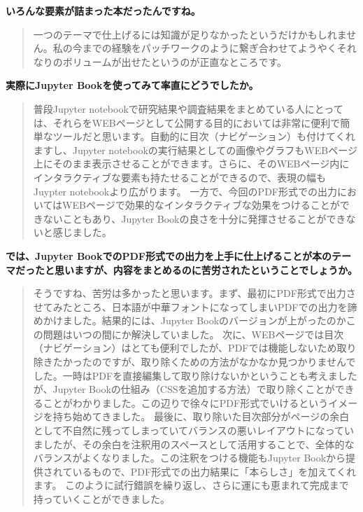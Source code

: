 \documentclass[dvipdfmx,autodetect-engine,10pt,b5paper,papersize,openany,dvipsnames]{jsbook}
\begin{document}
\begin{multicols}{2}
\noindent
\textbf{いろんな要素が詰まった本だったんですね。}


\begin{quotation}
  \noindent
一つのテーマで仕上げるには知識が足りなかったというだけかもしれません。私の今までの経験をパッチワークのように繋ぎ合わせてようやくそれなりのボリュームが出せたというのが正直なところです。
\end{quotation}


\noindent
\textbf{実際にJupyter Bookを使ってみて率直にどうでしたか。}


\begin{quotation}
  \noindent
普段Jupyter notebookで研究結果や調査結果をまとめている人にとっては、それらをWEBページとして公開する目的においては非常に便利で簡単なツールだと思います。自動的に目次（ナビゲーション）も付けてくれますし、Jupyter notebookの実行結果としての画像やグラフもWEBページ上にそのまま表示させることができます。さらに、そのWEBページ内にインタラクティブな要素も持たせることができるので、表現の幅もJuypter notebookより広がります。
一方で、今回のPDF形式での出力においてはWEBページで効果的なインタラクティブな効果をつけることができないこともあり、Jupyter Bookの良さを十分に発揮させることができないと感じました。
\end{quotation}


\noindent
\textbf{では、Jupyter BookでのPDF形式での出力を上手に仕上げることが本のテーマだったと思いますが、内容をまとめるのに苦労されたということでしょうか。}


\begin{quotation}
  \noindent
そうですね、苦労は多かったと思います。まず、最初にPDF形式で出力させてみたところ、日本語が中華フォントになってしまいPDFでの出力を諦めかけました。結果的には、Jupyter Bookのバージョンが上がったのかこの問題はいつの間にか解決していました。
次に、WEBページでは目次（ナビゲーション）はとても便利でしたが、PDFでは機能しないため取り除きたかったのですが、取り除くための方法がなかなか見つかりませんでした。一時はPDFを直接編集して取り除けないかということも考えましたが、Jupyter Bookの仕組み（CSSを追加する方法）で取り除くことができることがわかりました。この辺りで徐々にPDF形式でいけるというイメージを持ち始めてきました。
最後に、取り除いた目次部分がページの余白として不自然に残ってしまっていてバランスの悪いレイアウトになっていましたが、その余白を注釈用のスペースとして活用することで、全体的なバランスがよくなりました。この注釈をつける機能もJupyter Bookから提供されているもので、PDF形式での出力結果に「本らしさ」を加えてくれます。
このように試行錯誤を繰り返し、さらに運にも恵まれて完成まで持っていくことができました。
\end{quotation}



\end{multicols}
\end{document}
